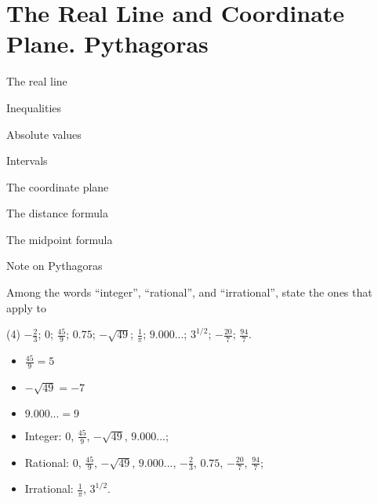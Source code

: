 \section{The Real Line and Coordinate Plane. Pythagoras}
\begin{introduction}
  \item The real line
  \item Inequalities
  \item Absolute values
  \item Intervals
  \item The coordinate plane
  \item The distance formula
  \item The midpoint formula
  \item Note on Pythagoras
\end{introduction}
\begin{questions}
  \item Among the words ``integer'', ``rational'', and ``irrational'', state the ones that apply to
  \begin{tasks}(4)
    \task \(-\frac{2}{3}\);
    \task \(0\);
    \task \(\frac{45}{9}\);
    \task \(0.75\);
    \task \(-\sqrt{49}\);
    \task \(\frac{1}{\pi}\);
    \task \(9.000...\);
    \task \(3^{1/2}\);
    \task \(-\frac{20}{7}\);
    \task \(\frac{94}{7}\).
  \end{tasks}

  \begin{note}
    \begin{itemize}
      \item \(\frac{45}{9} = 5\)
      \item \(-\sqrt{49} = -7\)
      \item \(9.000... = 9\)
    \end{itemize}
  \end{note}

  \begin{solution}
    \begin{itemize}
      \item Integer: \(0\), \(\frac{45}{9}\), \(-\sqrt{49}\), \(9.000...\);
      \item Rational: \(0\), \(\frac{45}{9}\), \(-\sqrt{49}\), \(9.000...\), \(-\frac{2}{3}\), \(0.75\), \(-\frac{20}{7}\), \(\frac{94}{7}\);
      \item Irrational: \(\frac{1}{\pi}\), \(3^{1/2}\).
    \end{itemize}
  \end{solution}


\end{questions}
